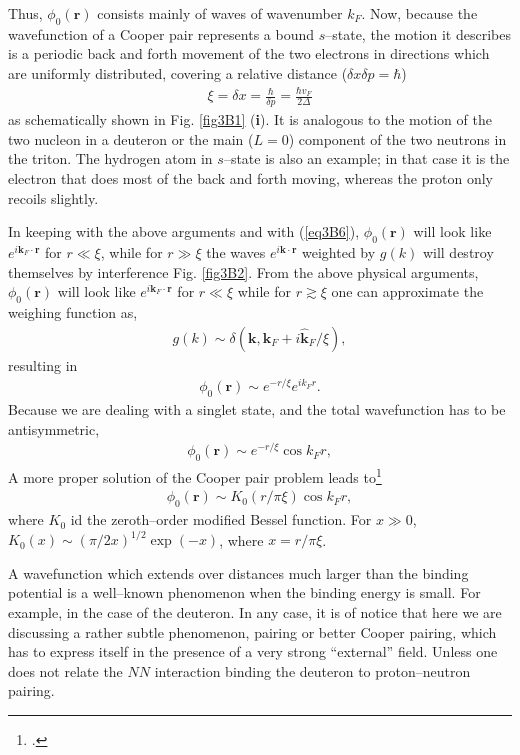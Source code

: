 \begin{subappendices}
Thus, $\phi_0(\mathbf r)$ consists mainly of waves of wavenumber $k_F$. Now, because the wavefunction of a Cooper pair represents a bound $s$--state, the motion it describes is a periodic back and forth movement of the two electrons in  directions which are uniformly distributed, covering a relative distance ($\delta x\delta p=\hbar$)
\begin{align}\label{eq3B6}
\xi=\delta x=\frac{\hbar}{\delta p}=\frac{\hbar v_F}{2\Delta}
\end{align}
as schematically shown in Fig. \ref{fig3B1} (\textbf{i}). It is analogous to the motion of the two nucleon in a deuteron or the main ($L=0$) component of the two neutrons in the triton. The hydrogen atom in $s$--state is also an example; in that case it is the electron that does most of the back and forth moving, whereas the proton only recoils slightly.

In keeping with the above arguments and with (\ref{eq3B6}), $\phi_0(\mathbf r)$ will look like $e^{i\mathbf k_F\cdot \mathbf r}$ for $r\ll\xi$, while for $r\gg \xi$ the waves $e^{i\mathbf k\cdot \mathbf r}$
weighted by $g(k)$ will destroy themselves by interference   Fig. \ref{fig3B2}. From the above physical arguments, $\phi_0(\mathbf r)$ will look like $e^{i\mathbf k_F\cdot \mathbf r}$ for $r\ll\xi$ while for $r\gtrsim\xi$ one can approximate the weighing function as,
\begin{align}\label{eq3B7}
g(k)\sim\delta(\mathbf k,\mathbf k_F+i\mathbf{\hat k}_F/\xi),
\end{align}
resulting in
\begin{align}\label{eq3B8}
\phi_0(\mathbf r)\sim e^{-r/\xi}e^{ik_Fr}.
\end{align}
Because we are dealing with a singlet state, and the total wavefunction has to be antisymmetric,
\begin{align}\label{eq3B9}
\phi_0(\mathbf r)\sim e^{-r/\xi}\cos k_Fr,
\end{align}
 A more proper solution of the Cooper pair problem leads to\footnote{\cite{Kadin:07}.}
\begin{align}\label{eq3B10}
\phi_0(\mathbf r)\sim K_0(r/\pi\xi)\cos k_Fr,
\end{align}
where $K_0$ id the zeroth--order modified Bessel function. For $x\gg 0$, $K_0(x)\sim (\pi/2x)^{1/2}\exp(-x)$, where $x=r/\pi\xi$.


A wavefunction which extends over distances much larger than the binding potential is a well--known phenomenon when the binding energy is small. For example, in the case of the deuteron. In any case, it is of notice that here we are discussing a rather subtle phenomenon, pairing or better Cooper pairing, which has to express itself in the presence of a very strong ``external'' field. Unless one does not relate the $NN$ interaction binding the deuteron to proton--neutron pairing. 


\end{subappendices}
